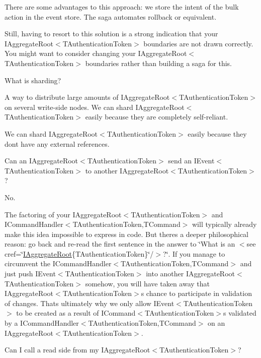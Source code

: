 There are some advantages to this approach\+: we store the intent of the bulk action in the event store. The saga automates rollback or equivalent. 

Still, having to resort to this solution is a strong indication that your I\+Aggregate\+Root$<$\+T\+Authentication\+Token$>$ boundaries are not drawn correctly. You might want to consider changing your I\+Aggregate\+Root$<$\+T\+Authentication\+Token$>$ boundaries rather than building a saga for this. 

What is sharding? 

A way to distribute large amounts of I\+Aggregate\+Root$<$\+T\+Authentication\+Token$>$ on several write-\/side nodes. We can shard I\+Aggregate\+Root$<$\+T\+Authentication\+Token$>$ easily because they are completely self-\/reliant. 

We can shard I\+Aggregate\+Root$<$\+T\+Authentication\+Token$>$ easily because they don\textquotesingle{}t have any external references. 

Can an I\+Aggregate\+Root$<$\+T\+Authentication\+Token$>$ send an I\+Event$<$\+T\+Authentication\+Token$>$ to another I\+Aggregate\+Root$<$\+T\+Authentication\+Token$>$? 

No. 

The factoring of your I\+Aggregate\+Root$<$\+T\+Authentication\+Token$>$ and I\+Command\+Handler$<$\+T\+Authentication\+Token,\+T\+Command$>$ will typically already make this idea impossible to express in code. But there\textquotesingle{}s a deeper philosophical reason\+: go back and re-\/read the first sentence in the answer to \char`\"{}\+What is an $<$see cref=\char`\"{}\hyperlink{interfaceCqrs_1_1Domain_1_1IAggregateRoot}{I\+Aggregate\+Root}\{T\+Authentication\+Token\}\char`\"{}/$>$?\char`\"{}. If you manage to circumvent the I\+Command\+Handler$<$\+T\+Authentication\+Token,\+T\+Command$>$ and just push I\+Event$<$\+T\+Authentication\+Token$>$ into another I\+Aggregate\+Root$<$\+T\+Authentication\+Token$>$ somehow, you will have taken away that I\+Aggregate\+Root$<$\+T\+Authentication\+Token$>$\textquotesingle{}s chance to participate in validation of changes. That\textquotesingle{}s ultimately why we only allow I\+Event$<$\+T\+Authentication\+Token$>$ to be created as a result of I\+Command$<$\+T\+Authentication\+Token$>$s validated by a I\+Command\+Handler$<$\+T\+Authentication\+Token,\+T\+Command$>$ on an I\+Aggregate\+Root$<$\+T\+Authentication\+Token$>$. 

Can I call a read side from my I\+Aggregate\+Root$<$\+T\+Authentication\+Token$>$? 

